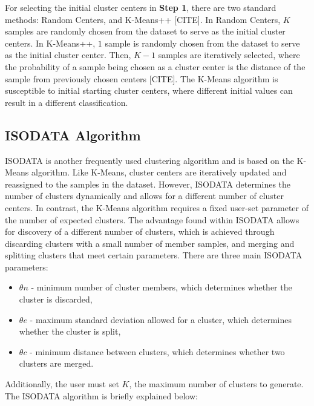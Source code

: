 \documentclass[a4paper,10pt]{article}
\begin{document}
For selecting the initial cluster centers in \textbf{Step 1}, there are two
standard methods: Random Centers, and K-Means++ [CITE]. In Random Centers, $K$
samples are randomly chosen from the dataset to serve as the initial cluster
centers. In K-Means++, $1$ sample is randomly chosen from the dataset to serve
as the initial cluster center. Then, $K-1$ samples are iteratively selected,
where the probability of a sample being chosen as a cluster center is the
distance of the sample from previously chosen centers [CITE]. The K-Means
algorithm is susceptible to initial starting cluster centers, where different
initial values can result in a different classification.

\subsection{ISODATA Algorithm}

ISODATA is another frequently used clustering algorithm and is based on the
K-Means algorithm. Like K-Means, cluster centers are iteratively updated and
reassigned to the samples in the dataset. However, ISODATA determines the number
of clusters dynamically and allows for a different number of cluster centers. In
contrast, the K-Means algorithm requires a fixed user-set parameter of the
number of expected clusters. The advantage found within ISODATA allows for
discovery of a different number of clusters, which is achieved through
discarding clusters with a small number of member samples, and merging and
splitting clusters that meet certain parameters. There are three main ISODATA
parameters:

\begin{itemize}
      \item $\theta n$ - minimum number of cluster members, which determines
            whether the cluster is discarded,
      \item $\theta e$ - maximum standard deviation allowed for a cluster, which
            determines whether the cluster is split,
      \item $\theta c$ - minimum distance between clusters, which determines
            whether two clusters are merged.
\end{itemize}

Additionally, the user must set $K$, the maximum number of clusters to generate.
The ISODATA algorithm is briefly explained below:
\end{document}
